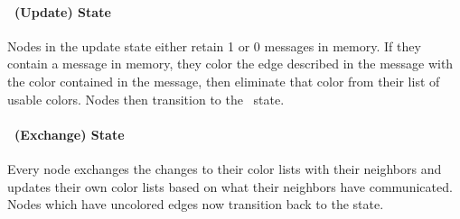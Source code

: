 \paragraph{\cUd\ (Update) State}
Nodes in the update state either retain 1 or 0 messages in memory. If they contain a message in memory, they color the edge described in the message with the color contained in the message, then eliminate that color from their list of usable colors. Nodes then transition to the \cEd\ state.

\paragraph{\cEd\ (Exchange) State}
Every node exchanges the changes to their color lists with their neighbors and updates their own color lists based on what their neighbors have communicated. Nodes which have uncolored edges now transition back to the \cCd state.
